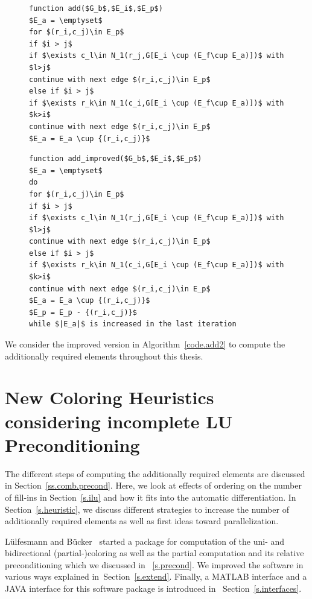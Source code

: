 \documentclass[12pt, twoside]{book}
\newcommand{\secref}[1]{Section~\protect\ref{#1}}
\newcommand{\coderef}[1]{Algorithm~\protect\ref{#1}}
\begin{document}
\begin{figure}
\begin{lstlisting}[caption=Find additionally required elements,
label=code.add,mathescape]
function add($G_b$,$E_i$,$E_p$)
$E_a = \emptyset$
for $(r_i,c_j)\in E_p$
if $i > j$
if $\exists c_l\in N_1(r_j,G[E_i \cup (E_f\cup E_a)])$ with $l>j$
continue with next edge $(r_i,c_j)\in E_p$
else if $i > j$
if $\exists r_k\in N_1(c_i,G[E_i \cup (E_f\cup E_a)])$ with $k>i$
continue with next edge $(r_i,c_j)\in E_p$
$E_a = E_a \cup {(r_i,c_j)}$
\end{lstlisting}
\end{figure}

\begin{figure}
\begin{lstlisting}[caption=Find additionally required elements (an improved version),
label=code.add2,mathescape]
function add_improved($G_b$,$E_i$,$E_p$)
$E_a = \emptyset$
do
for $(r_i,c_j)\in E_p$
if $i > j$
if $\exists c_l\in N_1(r_j,G[E_i \cup (E_f\cup E_a)])$ with $l>j$
continue with next edge $(r_i,c_j)\in E_p$
else if $i > j$
if $\exists r_k\in N_1(c_i,G[E_i \cup (E_f\cup E_a)])$ with $k>i$
continue with next edge $(r_i,c_j)\in E_p$
$E_a = E_a \cup {(r_i,c_j)}$
$E_p = E_p - {(r_i,c_j)}$
while $|E_a|$ is increased in the last iteration
\end{lstlisting}
\end{figure}
We consider the improved version in \coderef{code.add2}
to compute the additionally required elements
throughout this thesis.
\chapter[New Coloring Heuristics]{New Coloring Heuristics considering incomplete LU Preconditioning}
\label{package}
The different steps of computing the additionally required elements are discussed in
\secref{ss.comb.precond}. Here, we look at effects of ordering on the number of fill-ins
in \secref{s.ilu} and how it fits into the automatic differentiation.
In \secref{s.heuristic}, we discuss different strategies to increase the number of
additionally required elements as well as first ideas toward parallelization.

Lülfesmann and Bücker~\cite{Lulfesmann2012Fap} started a package for computation of the uni-
and bidirectional (partial-)coloring as well as the partial computation and its relative preconditioning
which we discussed in ~\ref{s.precond}.
We improved the software in various ways explained in~\secref{s.extend}.
Finally, a MATLAB interface and a JAVA interface for this software package is introduced
in ~\secref{s.interfaces}.
\end{document}
